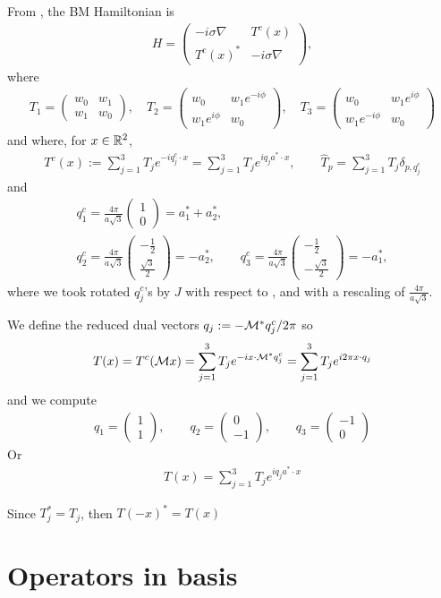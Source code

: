 \documentclass[11pt,a4paper,reqno,french,tikz]{amsart}
\newcommand{\na}{\nabla} %
\newcommand{\f}[2]{\frac{#1}{#2}} %
\newcommand{\mat}[1]{\begin{pmatrix} #1 \end{pmatrix}} %
\begin{document}
From \cite{BecEmbWitZwo21}, the BM Hamiltonian is
\begin{align*}
	H = \mat{-i\sigma \na & T^c(x) \\ T^c(x)^* & -i \sigma \na},
\end{align*}
where
\begin{align*}
\boxed{T_1 = \mat{w_0 & w_1 \\ w_1 & w_0}, \quad  T_2 = \mat{w_0 &  w_1e^{-i\phi} \\  w_1e^{i\phi} & w_0}, \quad T_3 = \mat{w_0 &  w_1e^{i\phi} \\  w_1e^{-i\phi} & w_0}}
\end{align*}
and where, for $x \in \mathbb{R}^2$,
\begin{align*}
T^c(x) := \sum_{j=1}^3 T_j e^{-iq^c_j \cdot x} = \sum_{j=1}^3 T_j e^{iq_j a^*\cdot x}, \qquad \widehat{T}_p = \sum_{j=1}^{3} T_j \delta_{p,q_j^c}
\end{align*}
and
\begin{multline*}
q^c_1 = \f{4\pi}{a\sqrt{3}} \mat{1 \\ 0} = a_1^* + a_2^*, \\
q^c_2 = \f{4\pi}{a\sqrt{3}} \mat{-\f 12 \\ \f{\sqrt{3}}{2}} = -a_2^*, \qquad q^c_3 = \f{4\pi}{a\sqrt{3}} \mat{-\f 12 \\ -\f{\sqrt{3}}{2}} = -a_1^*,
\end{multline*}
where we took rotated $q_j^c$'s by $J$ with respect to \cite{BecEmbWitZwo21}, and with a rescaling of $\f{4\pi}{a\sqrt{3}}$.

We define the reduced dual vectors $q_j := -\mathcal{M}^* q^c_j /2\pi$ so
\begin{align*}
T(x) = T^c(\mathcal{M} x) = \sum_{j=1}^3 T_j e^{-ix\cdot \mathcal{M}^* q_j^c}= \sum_{j=1}^3 T_j e^{i2\pi x\cdot q_j}
\end{align*}
and we compute
\begin{align*}
\boxed{q_1 = \mat{1 \\ 1}, \qquad q_{2} = \mat{0 \\ -1}, \qquad q_{3} = \mat{-1 \\ 0}}
\end{align*}
Or
\begin{align*}
\boxed{T(x) = \sum_{j=1}^3 T_j e^{i q_j a^* \cdot x}}
\end{align*}

Since $T_j^* = T_j$, then $T(-x)^* = T(x)$




\section{Operators in basis}%
\label{sec:operators_in_basis}
\end{document}
